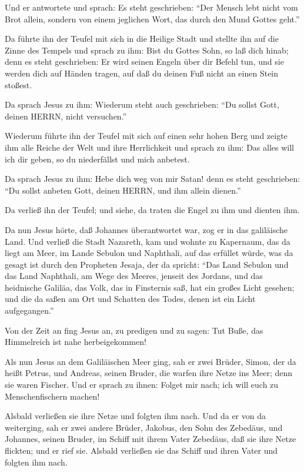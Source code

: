  Und er antwortete und sprach: Es steht geschrieben: ``Der
Mensch lebt nicht vom Brot allein, sondern von einem jeglichen Wort, das
durch den Mund Gottes geht.''

 Da führte ihn der Teufel mit sich in die Heilige Stadt und
stellte ihn auf die Zinne des Tempels  und sprach zu ihm:
Bist du Gottes Sohn, so laß dich hinab; denn es steht geschrieben: Er
wird seinen Engeln über dir Befehl tun, und sie werden dich auf Händen
tragen, auf daß du deinen Fuß nicht an einen Stein stoßest.

 Da sprach Jesus zu ihm: Wiederum steht auch geschrieben:
``Du sollst Gott, deinen HERRN, nicht versuchen.''

 Wiederum führte ihn der Teufel mit sich auf einen sehr
hohen Berg und zeigte ihm alle Reiche der Welt und ihre Herrlichkeit
 und sprach zu ihm: Das alles will ich dir geben, so du
niederfällst und mich anbetest.

 Da sprach Jesus zu ihm: Hebe dich weg von mir Satan! denn
es steht geschrieben: ``Du sollst anbeten Gott, deinen HERRN, und ihm
allein dienen.''

 Da verließ ihn der Teufel; und siehe, da traten die Engel
zu ihm und dienten ihm.

 Da nun Jesus hörte, daß Johannes überantwortet war, zog er
in das galiläische Land.  Und verließ die Stadt Nazareth,
kam und wohnte zu Kapernaum, das da liegt am Meer, im Lande Sebulon und
Naphthali,  auf das erfüllet würde, was da gesagt ist durch
den Propheten Jesaja, der da spricht:  ``Das Land Sebulon
und das Land Naphthali, am Wege des Meeres, jenseit des Jordans, und das
heidnische Galiläa,  das Volk, das in Finsternis saß, hat
ein großes Licht gesehen; und die da saßen am Ort und Schatten des
Todes, denen ist ein Licht aufgegangen.''

 Von der Zeit an fing Jesus an, zu predigen und zu sagen:
Tut Buße, das Himmelreich ist nahe herbeigekommen!

 Als nun Jesus an dem Galiläischen Meer ging, sah er zwei
Brüder, Simon, der da heißt Petrus, und Andreas, seinen Bruder, die
warfen ihre Netze ins Meer; denn sie waren Fischer.  Und er
sprach zu ihnen: Folget mir nach; ich will euch zu Menschenfischern
machen!

 Alsbald verließen sie ihre Netze und folgten ihm nach.
 Und da er von da weiterging, sah er zwei andere Brüder,
Jakobus, den Sohn des Zebedäus, und Johannes, seinen Bruder, im Schiff
mit ihrem Vater Zebedäus, daß sie ihre Netze flickten; und er rief sie.
 Alsbald verließen sie das Schiff und ihren Vater und
folgten ihm nach.

